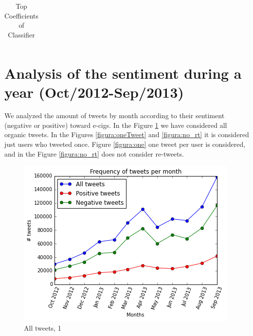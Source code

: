 \documentclass{sig-alternate}
\begin{document}
\begin{table}[t]
\centering
\caption{Top Coefficients of Classifier}
\label{tab:coef}
\begin{tabular}{|r|p{14cm}| }
\hline

\end{tabular}
\end{table}


\section{Analysis of the sentiment during a year (Oct/2012-Sep/2013)}

We analyzed the amount of tweets by month according to their sentiment (negative or positive) toward e-cigs. In the Figure \ref{figura:all_org} we have considered all organic tweets. In the Figures \ref{figura:oneTweet} and \ref{figura:no_rt} it is considered just users who tweeted once. Figure \ref{figura:one} one tweet per user is considered, and in the Figure \ref{figura:no_rt} does not consider re-tweets.

\begin{figure}[t]
  \centering
  \includegraphics[width=\columnwidth]{download(1).png}
  \caption{All tweets, 1}
  \label{figura:all_org}
\end{figure}
\end{document}
